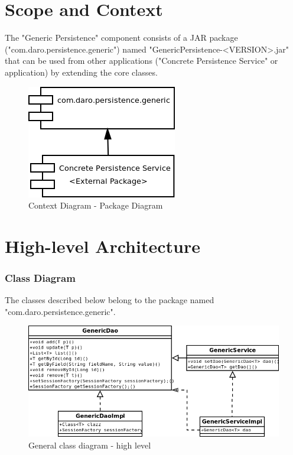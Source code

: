 \documentclass[a4paper,11pt]{book}
\begin{document}
\section{Scope and Context}
The "Generic Persistence" component consists of a JAR package ("com.daro.persistence.generic") named "GenericPersistence-<VERSION>.jar" that can be used from other applications ("Concrete Persistence Service" or application) by extending the core classes.

\begin{figure}[h] %
  \includegraphics{generic_persistence_package_diagram}
  \caption{Context Diagram - Package Diagram}
  \centering
  \label{fig:context} %
\end{figure}

\section{High-level Architecture}

\pagebreak
\subsubsection{Class Diagram}
The classes described below belong to the package named "com.daro.persistence.generic".

\begin{figure}[h] %
  \includegraphics[width=\textwidth]{generic_persistence_class_diagram}
  \caption{General class diagram - high level}
  \centering
  \label{fig:generic_persistence_class_diagram} %
\end{figure}
\end{document}
